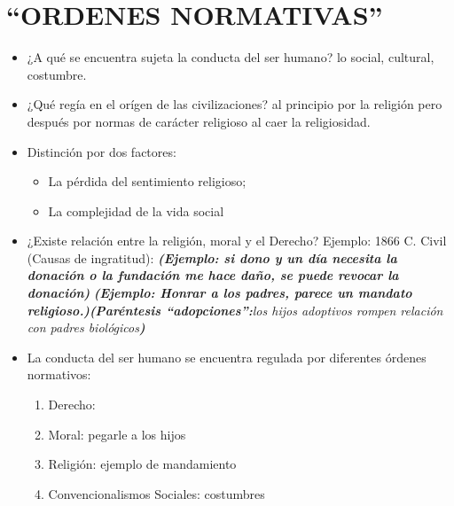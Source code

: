 \section{``ORDENES NORMATIVAS''}
\begin{itemize}
    \item ¿A qué se encuentra sujeta la conducta del ser humano? lo social, cultural, costumbre.

    \item ¿Qué regía en el orígen de las civilizaciones? al principio por la religión pero después por normas de carácter religioso al caer la religiosidad.
    
    \item Distinción por dos factores: 
    \begin{itemize}
        \item La pérdida del sentimiento religioso;
        \item La complejidad de la vida social
    \end{itemize}
    
    \item ¿Existe relación entre la religión, moral y el Derecho?
   Ejemplo: 1866 C. Civil (Causas de ingratitud): \textbf{\emph{(Ejemplo: si dono y un día necesita la donación o la fundación me hace daño, se puede revocar la donación)}} \textbf{\emph{(Ejemplo: Honrar a los padres, parece un mandato religioso.)}}\emph{\textbf{(Paréntesis ``adopciones'':}los hijos adoptivos rompen relación con padres biológicos\textbf{)}}
    \item La conducta del ser humano se encuentra regulada por diferentes órdenes normativos:  
    \begin{enumerate}
        \item Derecho: 
        \item Moral: pegarle a los hijos 
        \item Religión: ejemplo de mandamiento
        \item Convencionalismos Sociales: costumbres
    \end{enumerate}
\end{itemize}

